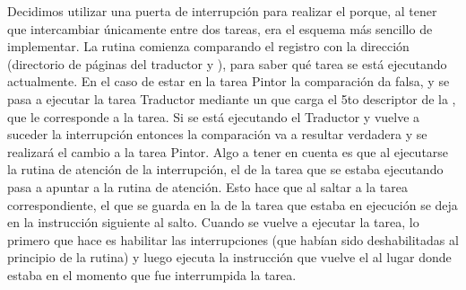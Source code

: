 Decidimos utilizar una puerta de interrupción para realizar el  porque, al tener que intercambiar únicamente entre dos tareas, era el
esquema más sencillo de implementar. La rutina comienza comparando el registro  con la dirección  (directorio de páginas del traductor 
y ), para saber qué tarea se está ejecutando actualmente. En el caso de estar en la tarea Pintor la comparación da falsa, y se pasa a 
ejecutar la tarea Traductor mediante un  que carga el 5to descriptor de la , que le corresponde a la tarea. Si se está ejecutando el 
Traductor y vuelve a suceder la interrupción entonces la comparación va a resultar verdadera y se realizará el cambio a la tarea Pintor. Algo a tener en cuenta
es que al ejecutarse la rutina de atención de la interrupción, el  de la tarea que se estaba ejecutando pasa a apuntar a la rutina de atención. Esto
hace que al saltar a la tarea correspondiente, el  que se guarda en la  de la tarea que estaba en ejecución se deja en la instrucción siguiente
al salto. Cuando se vuelve a ejecutar la tarea, lo primero que hace es habilitar las interrupciones (que habían sido deshabilitadas al principio de la rutina) 
y luego ejecuta la instrucción  que vuelve el  al lugar donde estaba en el momento que fue interrumpida la tarea.


